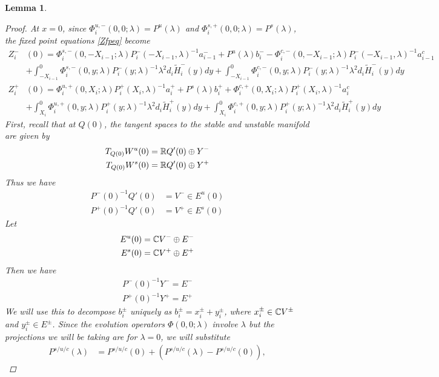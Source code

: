 \documentclass[10pt,reqno]{amsart}
\theoremstyle{plain}
\newtheorem{lemma}[theorem]{Lemma}
\theoremstyle{definition}
\theoremstyle{remark}
\numberwithin{theorem}{section}
\numberwithin{equation}{section}
\begin{document}
\begin{lemma}
\begin{proof}
At $x = 0$, since $\Phi_i^{u,-}(0, 0; \lambda) = P^u(\lambda)$ and $\Phi_i^{s,+}(0, 0; \lambda) = P^s(\lambda)$, 
the fixed point equations \eqref{Zfpeq} become
\begin{align*}
Z_i^-&(0) = \Phi_i^{s,-}(0, -X_{i-1}; \lambda) P_i^-(-X_{i-1}, \lambda)^{-1} a_{i-1}^- + P^u(\lambda) b_i^- - \Phi_i^{c,-}(0, -X_{i-1}; \lambda) P_i^-(-X_{i-1}, \lambda)^{-1} a_{i-1}^c \\
&+ \int_{-X_{i-1}}^0 \Phi_i^{s,-}(0, y; \lambda) P_i^-(y; \lambda)^{-1} \lambda^2 d_i \tilde{H}_i^-(y) dy + \int_{-X_{i-1}}^0 \Phi_i^{c,-}(0, y; \lambda) P_i^-(y; \lambda)^{-1} \lambda^2 d_i \tilde{H}_i^-(y) dy \\
Z_i^+&(0) = \Phi_i^{u,+}(0, X_i; \lambda) P_i^+(X_i, \lambda)^{-1} a_i^+ +  P^s(\lambda)b_i^+ + \Phi_i^{c,+}(0, X_i; \lambda) P_i^+(X_i, \lambda)^{-1} a_i^c \\
&+ \int_{X_i}^0 \Phi_i^{u,+}(0, y; \lambda) P_i^+(y; \lambda)^{-1} \lambda^2 d_i \tilde{H}_i^+(y) dy 
+ \int_{X_i}^0 \Phi_i^{c,+}(0, y; \lambda) P_i^+(y; \lambda)^{-1} \lambda^2 d_i \tilde{H}_i^+(y) dy 
\end{align*}
First, recall that at $Q(0)$, the tangent spaces to the stable and unstable manifold are given by
\begin{align*}
T_{Q(0)} W^u(0) &= \mathbb{R} Q'(0) \oplus Y^- \\
T_{Q(0)} W^s(0) &= \mathbb{R} Q'(0) \oplus Y^+
\end{align*}
Thus we have
\begin{align*}
P^-(0)^{-1} Q'(0) &= V^- \in E^u(0) \\
P^+(0)^{-1} Q'(0) &= V^+ \in E^s(0)
\end{align*}
Let
\begin{align*}
E^u(0) &= \mathbb{C} V^- \oplus E^- \\
E^s(0) &= \mathbb{C} V^+ \oplus E^+
\end{align*}
Then we have
\begin{align*}
P^-(0)^{-1} Y^- = E^- \\
P^+(0)^{-1} Y^+ = E^+
\end{align*}
We will use this to decompose $b_i^\pm$ uniquely as $b_i^\pm = x_i^\pm + y_i^\pm$, where $x_i^\pm \in \mathbb{C} V^\pm$ and $y_i^\pm \in E^\pm$. Since the evolution operators $\Phi(0, 0; \lambda)$ involve $\lambda$ but the projections we will be taking are for $\lambda = 0$, we will substitute
\begin{align*}
P^{s/u/c}(\lambda) &= P^{s/u/c}(0) + (P^{s/u/c}(\lambda) - P^{s/u/c}(0)),

\end{align*}
\end{proof}
\end{lemma}
\end{document}
